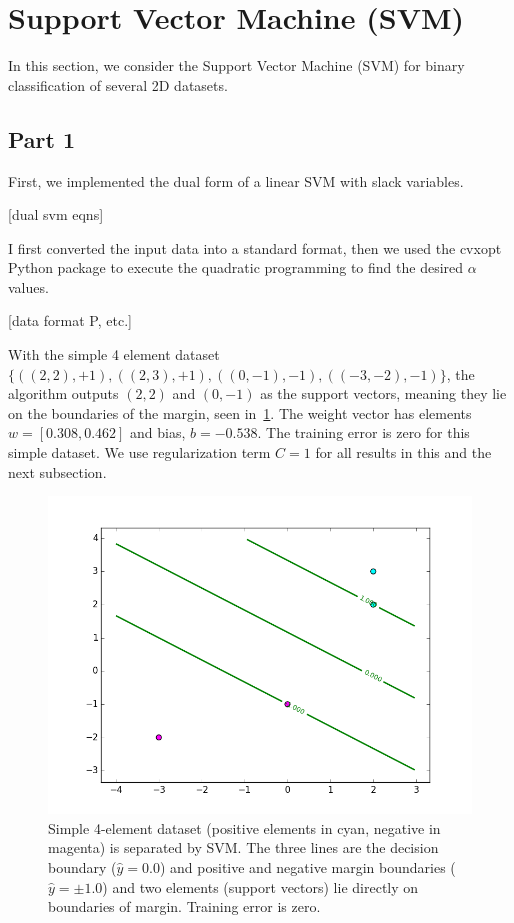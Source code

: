 \section{Support Vector Machine (SVM)} \label{sec:prob2}
In this section, we consider the Support Vector Machine (SVM) for binary classification of several 2D datasets.

\subsection{Part 1}
First, we implemented the dual form of a linear SVM with slack variables.

[dual svm eqns]

I first converted the input data into a standard format, then we used the cvxopt Python package to execute the quadratic programming to find the desired $\alpha$ values.

[data format P, etc.]

With the simple 4 element dataset $\{((2,2),+1),((2,3),+1),((0,-1),-1),((-3,-2),-1)\}$, the algorithm outputs $(2,2)$ and $(0,-1)$ as the support vectors, meaning they lie on the boundaries of the margin, seen in~\cref{fig:2_1_decisions}.
The weight vector has elements $w = [0.308, 0.462]$ and bias, $b = -0.538$.
The training error is zero for this simple dataset.
We use regularization term $C=1$ for all results in this and the next subsection.

\begin{figure}
	\centering
	\includegraphics [trim=0 0 0 0, clip, angle=0, width=0.8\columnwidth,
	keepaspectratio]{figures/2_1_decisions}
	\caption{Simple 4-element dataset (positive elements in cyan, negative in magenta) is separated by SVM. The three lines are the decision boundary ($\hat{y}=0.0$) and positive and negative margin boundaries ($\hat{y}=\pm1.0$) and two elements (support vectors) lie directly on boundaries of margin. Training error is zero.}
	\label{fig:2_1_decisions} 
\end{figure}


